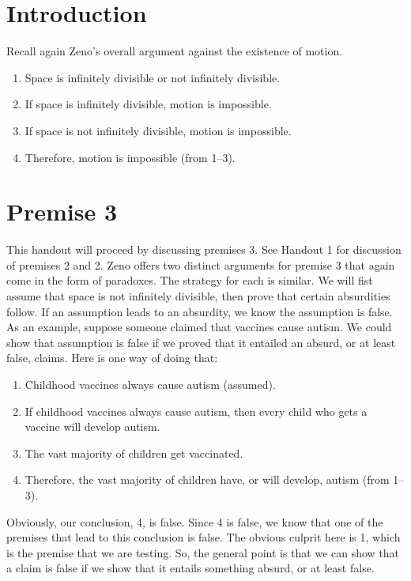 \documentclass[oneside]{article}
\begin{document}
\thispagestyle{fancy}



\section{Introduction}

Recall again Zeno's overall argument against the existence of motion. 

\begin{enumerate}
\item Space is infinitely divisible or not infinitely divisible.
\item  If space is infinitely divisible, motion is impossible.
\item  If space is not infinitely divisible, motion is impossible.
\item  Therefore, motion is impossible (from 1--3).
\end{enumerate}

\section{Premise 3}\label{premise-3}

This handout will proceed by discussing premises 3. See Handout 1 for discussion of premises 2 and 2. Zeno offers two distinct arguments for premise 3 that again come in the form of paradoxes. The strategy for each is similar. We will fist assume that space is not infinitely divisible,
then prove that certain absurdities follow. If an assumption leads to an
absurdity, we know the assumption is false. As an example, suppose someone claimed that vaccines cause autism. We could show that assumption is false if we proved that it entailed an absurd, or at least false, claims. Here is one way of doing that: 

\begin{enumerate}
\item  Childhood vaccines always cause autism (assumed). 
\item If childhood vaccines always cause autism, then every child who gets a vaccine will develop autism. 
\item The vast majority of children get vaccinated. 
\item Therefore, the vast majority of children have, or will develop, autism (from 1--3). 
\end{enumerate}
Obviously, our conclusion, 4, is false. Since 4 is false, we know that one of the premises that lead to this conclusion is false. The obvious culprit here is 1, which is the premise that we are testing. So, the general point is that we can show that a claim is false if we show that it entails something absurd, or at least false. 
\end{document}
